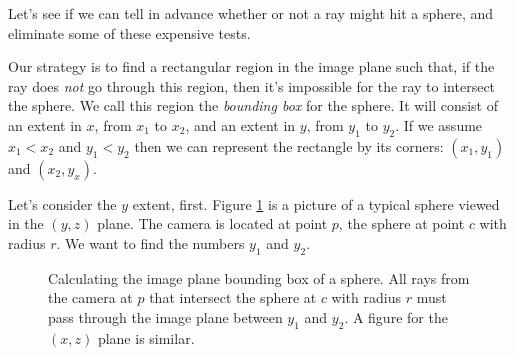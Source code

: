 \documentclass{article}
\newcommand{\mydot}[1]{\draw[fill] (#1) circle (0.1);}
\begin{document}
\begin{description}
\begin{description}
  Let's see if we can tell in advance whether or not a ray might hit a
  sphere, and eliminate some of these expensive tests.

Our strategy is to find a rectangular region in the image plane such
that, if the ray does {\em not} go through this region, then it's
impossible for the ray to intersect the sphere.  We call this region
the {\em bounding box} for the sphere.  It will consist of an extent
in $x$, from $x_1$ to $x_2$, and an extent in $y$, from $y_1$ to
$y_2$.  If we assume   $x_1 < x_2$ and $y_1 < y_2$ then we can
represent the rectangle by its corners: $(x_1,y_1)$ and $(x_2, y_x)$.  

Let's consider the $y$ extent, first.  Figure \ref{spherebox} is a
picture of a typical sphere viewed in the $(y,z)$ plane.  The camera is
located at point $p$, the sphere at point $c$ with radius $r$.  We
want to find the numbers $y_1$ and $y_2$.



  \begin{figure}
    \begin{center}
    \end{center}
    \caption{Calculating the image plane bounding box of a sphere.
      All rays from 
      the camera at $p$ that intersect the sphere at $c$ with radius
      $r$ must pass through the image plane between $y_1$ and $y_2$.
      A figure for the $(x,z)$ plane is similar.}
    \label{spherebox}
    

\end{figure}
\end{description}
\end{description}
\end{document}
